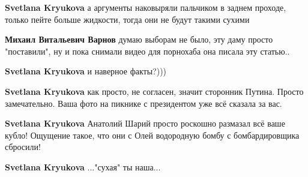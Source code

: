 \begin{itemize}
\begin{itemize}
 
\textbf{Svetlana Kryukova} а аргументы наковыряли пальчиком в заднем проходе, только пейте больше жидкости, тогда они не будут такими сухими

 
\textbf{Михаил Витальевич Варнов} думаю выборам не было, эту даму просто "поставили", ну и пока снимали видео для порнохаба она писала эту статью..

 
\textbf{Svetlana Kryukova} и наверное факты?)))

 
\textbf{Svetlana Kryukova} как просто, не согласен, значит сторонник Путина. Просто замечательно. Ваша фото на пикнике с президентом уже всё сказала за вас.

 
\textbf{Svetlana Kryukova} Анатолий Шарий просто роскошно размазал всё ваше кубло! Ощущение такое, что они с Олей водородную бомбу с бомбардировщика сбросили!

 
\textbf{Svetlana Kryukova} ..."сухая" ты наша...

 

\end{itemize}
\end{itemize}
